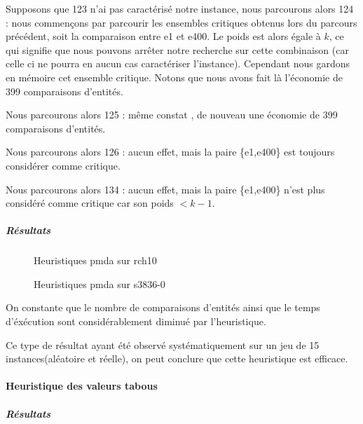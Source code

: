 Supposons que 123 n'ai pas caractérisé notre instance, nous parcourons alors 124 : nous commençons par parcourir les ensembles critiques obtenus lors du parcours précédent, soit la comparaison entre e1 et e400. Le poids est alors égale à $k$, ce qui signifie que nous pouvons arrêter notre recherche sur cette combinaison (car celle ci ne pourra en aucun cas caractériser l'instance). Cependant nous gardons en mémoire cet ensemble critique. Notons que nous avons fait là l'économie de 399 comparaisons d'entités.

Nous parcourons alors 125 : même constat , de nouveau une économie de 399 comparaisons d'entités.

Nous parcourons alors 126 : aucun effet, mais la paire \{e1,e400\} est toujours considérer comme critique.

Nous parcourons alors 134 : aucun effet, mais la paire  \{e1,e400\} n'est plus considéré comme critique car son poids $<k-1$.

\subparagraph{Résultats}
\begin{figure}[H]
\centering
	\begin{minipage}[c]{0.49\linewidth}
	\centering
	
	\end{minipage}
	\begin{minipage}[c]{0.49\linewidth}
	\centering
	
	\end{minipage}
\caption{Heuristiques pmda sur rch10}
\end{figure}

\begin{figure}[H]
\centering
	\begin{minipage}[c]{0.49\linewidth}
	\centering
	
	\end{minipage}
	\begin{minipage}[c]{0.49\linewidth}
	\centering
	
	\end{minipage}
\caption{Heuristiques pmda sur s3836-0}
\end{figure}

On constante que le nombre de comparaisons d'entités ainsi que le temps d'éxécution sont considérablement diminué par l'heuristique.

Ce type de résultat ayant été observé systématiquement sur un jeu de 15 instances(aléatoire et réelle), on peut conclure que cette heuristique est efficace.

\paragraph{Heuristique des valeurs tabous}
\subparagraph{Résultats}

